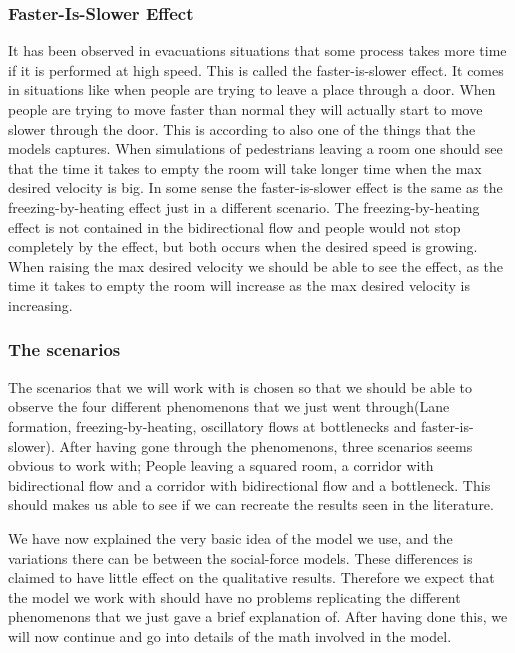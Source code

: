 \subsubsection{Faster-Is-Slower Effect}
It has been observed in evacuations situations that some process takes more
time if it is performed at high speed. This is called the faster-is-slower effect. It comes
in situations like when people are trying to leave a place through a door. When people are
trying to move faster than normal they will actually start to move slower through the door.
This is according to \cite{self-org} also one of the things that the models captures. When simulations
of pedestrians leaving a room one should see that the time it takes to empty the room will take longer time
when the max desired velocity is big. In some sense the faster-is-slower effect is the same as the
freezing-by-heating effect just in a different scenario. The freezing-by-heating effect is not contained
in the bidirectional flow and people would not stop completely by the effect,
but both occurs when the desired speed is growing.
When raising the max desired velocity we should be able to see the effect, as the time it takes to
empty the room will increase as the max desired velocity is increasing.

\subsubsection{The scenarios}
The scenarios that we will work with is chosen so that we should be able to observe the four
different phenomenons that we just went through(Lane formation, freezing-by-heating, oscillatory
flows at bottlenecks and faster-is-slower).
After having gone through the phenomenons, three scenarios seems obvious to work with;
People leaving a squared room, a corridor with bidirectional flow
and a corridor with bidirectional flow and a bottleneck.
This should makes us able to see if we can recreate the results seen in the literature.

We have now explained the very basic idea of the model we use, and the variations there can be between
the social-force models. These differences is claimed to have little effect on the qualitative results.
Therefore we expect that the model we work with should have no problems replicating the different phenomenons
that we just gave a brief explanation of. After having done this, we will now continue and go into
details of the math involved in the model.

